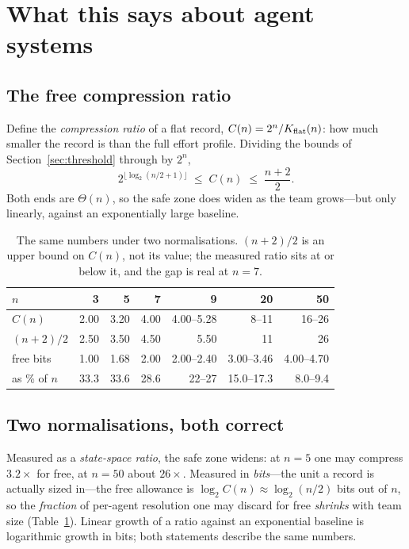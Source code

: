 \section{What this says about agent systems}
\label{sec:agents}

\subsection{The free compression ratio}

Define the \emph{compression ratio} of a flat record,
$C(n) = 2^n / K_{\mathrm{flat}}(n)$: how much smaller the record is than the full effort
profile. Dividing the bounds of Section~\ref{sec:threshold} through by $2^n$,
\[
  2^{\lfloor \log_2(n/2+1)\rfloor} \;\le\; C(n) \;\le\; \frac{n+2}{2}.
\]
Both ends are $\Theta(n)$, so the safe zone does widen as the team grows---but
only linearly, against an exponentially large baseline.

\begin{table}[t]
\centering
\caption{The same numbers under two normalisations. $(n+2)/2$ is an upper bound
on $C(n)$, not its value; the measured ratio sits at or below it, and the gap is
real at $n=7$.}
\label{tab:ratio}
\begin{tabular}{@{}lrrrrrr@{}}
\toprule
$n$ & 3 & 5 & 7 & 9 & 20 & 50 \\
\midrule
$C(n)$        & 2.00 & 3.20 & 4.00 & 4.00--5.28 & 8--11 & 16--26 \\
$(n+2)/2$     & 2.50 & 3.50 & 4.50 & 5.50 & 11 & 26 \\
free bits     & 1.00 & 1.68 & 2.00 & 2.00--2.40 & 3.00--3.46 & 4.00--4.70 \\
as \% of $n$  & 33.3 & 33.6 & 28.6 & 22--27 & 15.0--17.3 & 8.0--9.4 \\
\bottomrule
\end{tabular}
\end{table}

\subsection{Two normalisations, both correct}

Measured as a \emph{state-space ratio}, the safe zone widens: at $n=5$ one may
compress $3.2\times$ for free, at $n=50$ about $26\times$. Measured in
\emph{bits}---the unit a record is actually sized in---the free allowance is
$\log_2 C(n) \approx \log_2(n/2)$ bits out of $n$, so the \emph{fraction} of
per-agent resolution one may discard for free \emph{shrinks} with team size
(Table~\ref{tab:ratio}). Linear growth of a ratio against an exponential baseline
is logarithmic growth in bits; both statements describe the same numbers.

